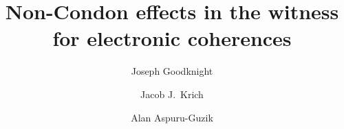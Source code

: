 



\title{Non-Condon effects in the witness for electronic coherences}

\author{Joseph Goodknight}
\author{Jacob J.\ Krich }
\author{Alan Aspuru-Guzik}
\begin{abstract}
  
\end{abstract}

\maketitle

%







